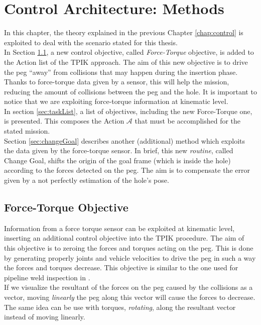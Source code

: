 

\chapter[Control Architecture: Methods]{Control Architecture: Methods}
\label{chap:method}
\ifpdf
    \graphicspath{{Method/Figures/PNG/}{Method/Figures/PDF/}{Method/Figures/}}
\else
    \graphicspath{{Method/Figures/EPS/}{Method/Figures/}}
\fi

In this chapter, the theory explained in the previous Chapter \ref{chap:control} is exploited to deal with the scenario stated for this thesis.\\
In Section \ref{sec:forceTask}, a new control objective, called \textit{Force-Torque} objective, is added to the Action list of the TPIK approach. The aim of this new objective is to drive the peg \enquote{away} from collisions that may happen during the insertion phase. Thanks to force-torque data given by a sensor, this will help the mission, reducing the amount of collisions between the peg and the hole. It is important to notice that we are exploiting force-torque information at kinematic level.\\
In section \ref{sec:taskList}, a list of objectives, including the new Force-Torque one, is presented. This composes the Action $\mathcal{A}$ that must be accomplished for the stated mission.\\
Section \ref{sec:changeGoal} describes another (additional) method which exploits the data given by the force-torque sensor. In brief, this new \textit{routine}, called Change Goal, shifts the origin of the goal frame (which is inside the hole) according to the forces detected on the peg. The aim is to compensate the error given by a not perfectly estimation of the hole's pose.


\section{Force-Torque Objective}
\label{sec:forceTask}
Information from a force torque sensor can be exploited at kinematic level, inserting an additional control objective into the TPIK procedure. The aim of this objective is to zeroing the forces and torques acting on the peg. This is done by generating properly joints and vehicle velocities to drive the peg in such a way the forces and torques decrease. This objective is similar to the one used for pipeline weld inspection in \cite{IntroRecent}.\\
If we visualize the resultant of the forces on the peg caused by the collisions as a vector, moving \textit{linearly} the peg along this vector will cause the forces to decrease. The same idea can be use with torques, \textit{rotating}, along the resultant vector instead of moving linearly.\\

